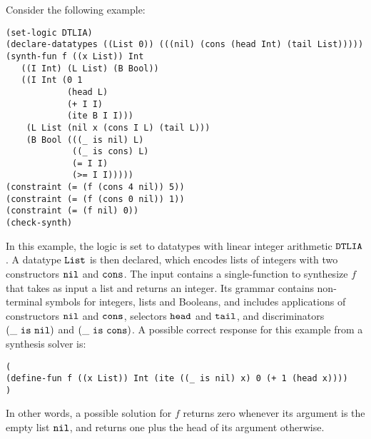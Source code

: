 \documentclass[english,a4paper,10pt]{article}
\begin{document}
\begin{example}
Consider the following example:
\begin{lstlisting}[language=SyGuS]
(set-logic DTLIA)
(declare-datatypes ((List 0)) (((nil) (cons (head Int) (tail List)))))
(synth-fun f ((x List)) Int
   ((I Int) (L List) (B Bool))
   ((I Int (0 1 
            (head L) 
            (+ I I)
            (ite B I I)))
    (L List (nil x (cons I L) (tail L)))
    (B Bool (((_ is nil) L) 
             ((_ is cons) L)
             (= I I)
             (>= I I)))))
(constraint (= (f (cons 4 nil)) 5))
(constraint (= (f (cons 0 nil)) 1))
(constraint (= (f nil) 0))
(check-synth)
\end{lstlisting}
In this example, the logic is set to 
datatypes with linear integer arithmetic ${\tt DTLIA}$.
A datatype ${\tt List}$ is then declared,
which encodes lists of integers with two constructors ${\tt nil}$ and ${\tt cons}$.
The input contains a single-function to synthesize $f$
that takes as input a list and returns an integer.
Its grammar contains non-terminal symbols for integers, lists and Booleans,
and includes applications of constructors ${\tt nil}$ and ${\tt cons}$,
selectors ${\tt head}$ and ${\tt tail}$, and
discriminators ${\tt (\_\ is\ nil)}$ and ${\tt (\_\ is\ cons)}$.
A possible correct response for this example from a synthesis solver is:
\begin{lstlisting}[language=SyGuS]
(
(define-fun f ((x List)) Int (ite ((_ is nil) x) 0 (+ 1 (head x))))
)
\end{lstlisting}
In other words, a possible solution for $f$ returns zero whenever its
argument is the empty list ${\tt nil}$, 
and returns one plus the head of its argument otherwise.
\end{example}
\end{document}
